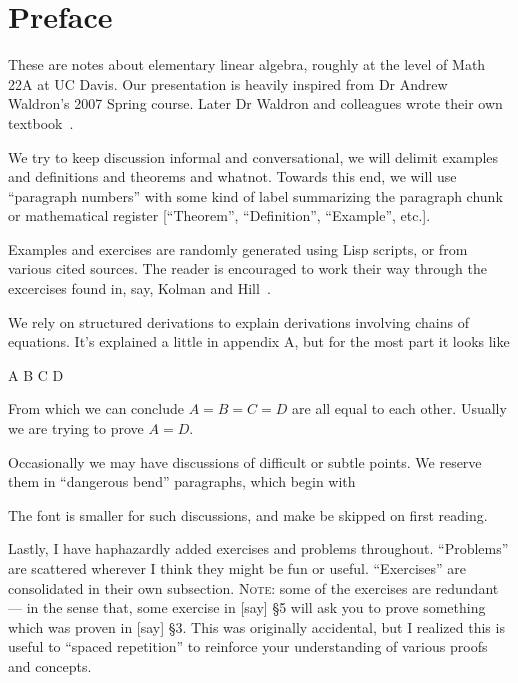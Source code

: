 \section*{Preface}

These are notes about elementary linear algebra, roughly at the level of
Math 22A at UC Davis. Our presentation is heavily inspired from Dr
Andrew Waldron's 2007 Spring course. Later Dr Waldron and colleagues
wrote their own textbook~\cite{waldron}.

We try to keep discussion informal and conversational, we will delimit
examples and definitions and theorems and whatnot. Towards this end, we
will use ``paragraph numbers'' with some kind of label summarizing the
paragraph chunk or mathematical register [``Theorem'', ``Definition'',
``Example'', etc.].

Examples and exercises are randomly generated using Lisp scripts, or
from various cited sources. The reader is encouraged to work their way
through the excercises found in, say, Kolman and Hill~\cite{kolman}.

We rely on structured derivations to explain derivations involving
chains of equations. It's explained a little in appendix A, but for the
most part it looks like
\begin{calculation}
  A
  B
  C
  D
\end{calculation}
From which we can conclude $A=B=C=D$ are all equal to each
other. Usually we are trying to prove $A=D$.

Occasionally we may have discussions of difficult or subtle points. We
reserve them in ``dangerous bend'' paragraphs, which begin with
\begin{center}
  \dbend\smallbreak
\end{center}
The font is smaller for such discussions, and make be skipped on first
reading.

Lastly, I have haphazardly added exercises and problems
throughout. ``Problems'' are scattered wherever I think they might be
fun or useful. ``Exercises'' are consolidated in their own subsection.
\textsc{Note:} some of the exercises are redundant --- in the sense
that, some exercise in [say] \S5 will ask you to prove something which was
proven in [say] \S3. This was originally accidental, but I realized this
is useful to ``spaced repetition'' to reinforce your understanding of
various proofs and concepts.